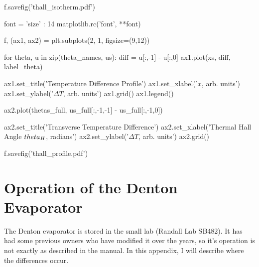 \documentclass{thesis-umich}
\begin{document}
\begin{singlespace}
\begin{code}
f.savefig('thall_isotherm.pdf')

font = {'size'   : 14}
matplotlib.rc('font', **font)

f, (ax1, ax2) = plt.subplots(2, 1, figsize=(9,12))

for theta, u in zip(theta_names, us):
    diff = u[:,-1] - u[:,0]
    ax1.plot(xs, diff, label=theta)

ax1.set_title('Temperature Difference Profile')
ax1.set_xlabel('$x$, arb. units')
ax1.set_ylabel('$\Delta T$, arb. units')
ax1.grid()
ax1.legend()

ax2.plot(thetas_full, us_full[:,-1,-1] - us_full[:,-1,0])

ax2.set_title('Transverse Temperature Difference')
ax2.set_xlabel('Thermal Hall Angle $\\theta_H$, radians')
ax2.set_ylabel('$\Delta T$, arb. units')
ax2.grid()

f.savefig('thall_profile.pdf')

\end{code}
\end{singlespace}

\chapter{Operation of the Denton Evaporator}

The Denton evaporator is stored in the small lab (Randall Lab SB482). It has had some previous owners who have modified it over the years, so it's operation is not exactly as described in the manual. In this appendix, I will describe where the differences occur.
\end{document}
